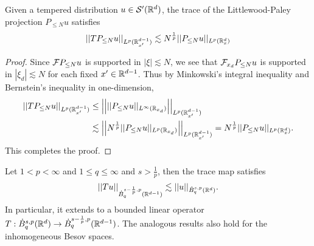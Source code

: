 \begin{lemma}
	Given a tempered distribution $u \in \mathcal S' (\mathbb R^d)$, the trace of the Littlewood-Paley projection $P_{\leq N} u$ satisfies
		\[ || TP_{\leq N} u ||_{L^p (\mathbb R^{d - 1}_{x'})} \lesssim N^{\frac1p} ||P_{\leq N} u||_{L^p (\mathbb R^d_x)} \]
\end{lemma}

\begin{proof}
	Since $\mathcal F P_{\leq N} u$ is supported in $|\xi| \lesssim N$, we see that $\mathcal F_{x_d} P_{\leq N} u$ is supported in $|\xi_d| \lesssim N$ for each fixed $x' \in \mathbb R^{d - 1}$. Thus by Minkowski's integral inequality and Bernstein's inequality in one-dimension, 
		\begin{align*}
			||T P_{\leq N} u||_{L^p (\mathbb R^{d - 1}_{x'})}
				&\leq \left|\left| || P_{\leq N} u||_{L^\infty (\mathbb R_{x_d})} \right|\right|_{L^p (\mathbb R^{d - 1}_{x'})} \\
				&\lesssim  \left|\left| N^{\frac1p} || P_{\leq N} u||_{L^p (\mathbb R_{x_d})} \right|\right|_{L^p (\mathbb R^{d - 1}_{x'})} = N^{\frac1p} ||P_{\leq N} u||_{L^p (\mathbb R^d_x)}.
		\end{align*}
	This completes the proof. 	
\end{proof}
	
\begin{theorem}
	Let $1 < p < \infty$ and $1 \leq q \leq \infty$ and $s > \tfrac1p$, then the trace map satisfies
		\[ ||T u||_{\dot B^{s - \frac1p, p}_q (\mathbb R^{d - 1})} \lesssim ||u||_{\dot B^{s, p}_q (\mathbb R^d)}. \]
	In particular, it extends to a bounded linear operator $T : \dot B^{s, p}_q (\mathbb R^d) \to \dot B^{s - \frac1p, p}_q (\mathbb R^{d - 1})$. The analogous results also hold for the inhomogeneous Besov spaces. 
\end{theorem}

